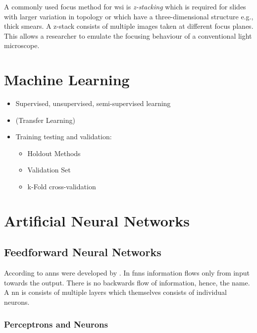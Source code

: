 A commonly used focus method for \ac{wsi} is \emph{z-stacking} \cite{el-gabry2014wholeslide} which is required for slides with larger variation in topology or which have a three-dimensional structure e.g., thick smears. A z-stack consists of multiple images taken at different focus planes. This allows a researcher to emulate the focusing behaviour of a conventional light microscope. 



\section{Machine Learning}

\begin{itemize}
    \item Supervised, unsupervised, semi-supervised learning
    \item (Transfer Learning)
    \item Training testing and validation:
    \begin{itemize}
        \item Holdout Methods
        \item Validation Set
        \item k-Fold cross-validation
    \end{itemize}
\end{itemize}

\section{Artificial Neural Networks}
\label{sec:Foundations:NeuralNetworks}


\subsection{Feedforward Neural Networks}
\label{sec:Foundations:NeuralNetworks:FNN}

According to \textcite{nielsen2015neural} \acp{ann} were developed by \textcite{rosenblatt1958perceptron}. In \acp{fnn} information flows only from input towards the output. There is no backwards flow of information, hence, the name.
A \ac{nn} is consists of multiple layers which themselves consists of individual neurons.

\subsubsection{Perceptrons and Neurons}
\label{sec:Foundations:NeuralNetworks:Perceptrons}

